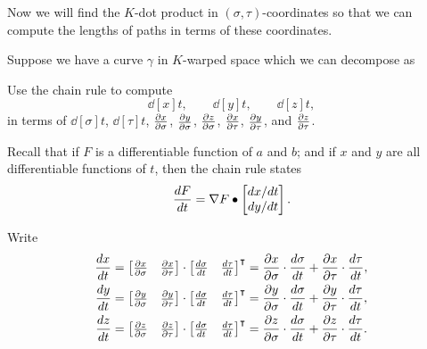 \documentclass[newpage,hints,handout,noauthor,nooutcomes,12pt]{ximera}
\begin{document}
Now we will find the $K$-dot product in $(\sigma,\tau)$-coordinates so
that we can compute the lengths of paths in terms of these
coordinates.

\begin{problem}
  Suppose we have a curve $\gamma$ in $K$-warped space which we can decompose as


    \begin{center}
    \end{center}

Use the chain rule to compute
\[
\dd[x]{t},\qquad \dd[y]{t}, \qquad \dd[z]{t},
\]
in terms of $\dd[\sigma]{t}$, $\dd[\tau]{t}$, $\pp[x]{\sigma}$,
$\pp[y]{\sigma}$, $\pp[z]{\sigma}$, $\pp[x]{\tau}$, $\pp[y]{\tau}$,
and $\pp[z]{\tau}$.
\begin{hint}
  Recall that if $F$ is a differentiable function of $a$ and $b$; and if $x$ and
  $y$ are all differentiable functions of $t$, then the chain rule states
  \[
  \dd[F]{t} = \nabla F \dot
  \begin{bmatrix}
    dx/dt \\ dy/dt
  \end{bmatrix}
  .
  \]
\end{hint}
\begin{freeResponse}
  Write
  \begin{align*}
    \dd[x]{t} &= \begin{bmatrix}\pp[x]{\sigma} & \pp[x]{\tau}\end{bmatrix}\cdot\begin{bmatrix}\dd[\sigma]{t} & \dd[\tau]{t}\end{bmatrix}^\transpose = \pp[x]{\sigma}\cdot\dd[\sigma]{t}+\pp[x]{\tau}\cdot\dd[\tau]{t}, \\
    \dd[y]{t} &= \begin{bmatrix}\pp[y]{\sigma} & \pp[y]{\tau}\end{bmatrix}\cdot\begin{bmatrix}\dd[\sigma]{t} & \dd[\tau]{t}\end{bmatrix}^\transpose = \pp[y]{\sigma}\cdot\dd[\sigma]{t}+\pp[y]{\tau}\cdot\dd[\tau]{t}, \\
    \dd[z]{t} &= \begin{bmatrix}\pp[z]{\sigma} & \pp[z]{\tau}\end{bmatrix}\cdot\begin{bmatrix}\dd[\sigma]{t} & \dd[\tau]{t}\end{bmatrix}^\transpose = \pp[z]{\sigma}\cdot\dd[\sigma]{t}+\pp[z]{\tau}\cdot\dd[\tau]{t}.  
  \end{align*}
\end{freeResponse}
\end{problem}
\end{document}
